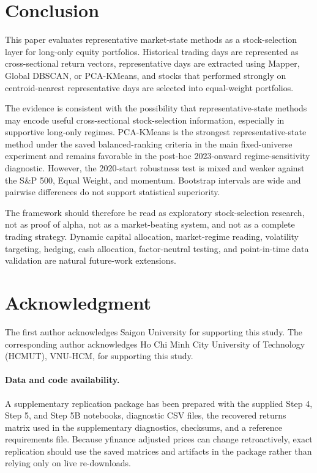 \documentclass[runningheads]{llncs}
\begin{document}
\section{Conclusion}

This paper evaluates representative market-state methods as a stock-selection layer for long-only equity portfolios. Historical trading days are represented as cross-sectional return vectors, representative days are extracted using Mapper, Global DBSCAN, or PCA-KMeans, and stocks that performed strongly on centroid-nearest representative days are selected into equal-weight portfolios.

The evidence is consistent with the possibility that representative-state methods may encode useful cross-sectional stock-selection information, especially in supportive long-only regimes. PCA-KMeans is the strongest representative-state method under the saved balanced-ranking criteria in the main fixed-universe experiment and remains favorable in the post-hoc 2023-onward regime-sensitivity diagnostic. However, the 2020-start robustness test is mixed and weaker against the S\&P 500, Equal Weight, and momentum. Bootstrap intervals are wide and pairwise differences do not support statistical superiority.

The framework should therefore be read as exploratory stock-selection research, not as proof of alpha, not as a market-beating system, and not as a complete trading strategy. Dynamic capital allocation, market-regime reading, volatility targeting, hedging, cash allocation, factor-neutral testing, and point-in-time data validation are natural future-work extensions.

\section*{Acknowledgment}

The first author acknowledges Saigon University for supporting this study. The corresponding author acknowledges Ho Chi Minh City University of Technology (HCMUT), VNU-HCM, for supporting this study.

\paragraph{Data and code availability.} A supplementary replication package has been prepared with the supplied Step 4, Step 5, and Step 5B notebooks, diagnostic CSV files, the recovered returns matrix used in the supplementary diagnostics, checksums, and a reference requirements file. Because yfinance adjusted prices can change retroactively, exact replication should use the saved matrices and artifacts in the package rather than relying only on live re-downloads.
\end{document}

